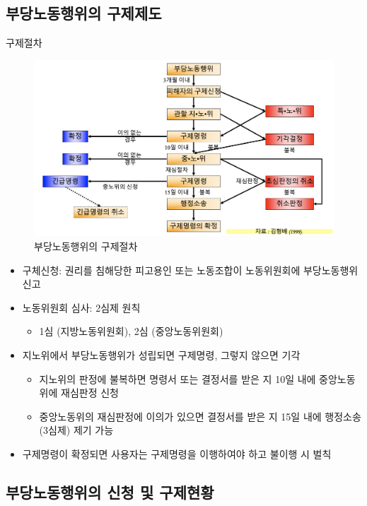 \documentclass[aspectratio=169,xcolor=dvipsnames,handout]{beamer}
\begin{document}
\subsection{부당노동행위의 구제제도}

\begin{frame}[allowframebreaks]{구제절차}
    \centering
    \begin{figure}
        \includegraphics[width=.6\textwidth]{pic/구제제도.png}
        \caption{부당노동행위의 구제절차}
    \end{figure}
    \begin{itemize}[<+->]
        \item 구체신청: 권리를 침해당한 피고용인 또는 노동조합이 노동위원회에 부당노동행위 신고
        \item 노동위원회 심사: 2심제 원칙
        \begin{itemize}[<+->]
            \item 1심 (지방노동위원회), 2심 (중앙노동위원회)
        \end{itemize}
        \item 지노위에서 부당노동행위가 성립되면 구제명령, 그렇지 않으면 기각
        \begin{itemize}[<+->]
            \item 지노위의 판정에 불복하면 명령서 또는 결정서를 받은 지 10일 내에 중앙노동위에 재심판정 신청
            \item 중앙노동위의 재심판정에 이의가 있으면 결정서를 받은 지 15일 내에 행정소송 (3심제) 제기 가능
        \end{itemize}
    \item 구제명령이 확정되면 사용자는 구제명령을 이행하여야 하고 불이행 시 벌칙
    \end{itemize}
\end{frame}

\subsection{부당노동행위의 신청 및 구제현황}
\end{document}
